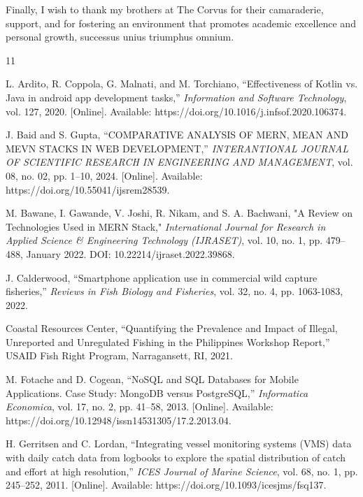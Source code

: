\documentclass[journal]{IEEEtran}
\begin{document}
Finally, I wish to thank my brothers at The Corvus for their camaraderie, support, and for fostering an environment that promotes academic excellence and personal growth, successus unius triumphus omnium.


\ifCLASSOPTIONcaptionsoff
  \newpage
\fi

\newpage

\begin{thebibliography}{11}

L. Ardito, R. Coppola, G. Malnati, and M. Torchiano, ``Effectiveness of Kotlin vs. Java in android app development tasks,'' \emph{Information and Software Technology}, vol. 127, 2020. [Online]. Available: https://doi.org/10.1016/j.infsof.2020.106374.

J. Baid and S. Gupta, ``COMPARATIVE ANALYSIS OF MERN, MEAN AND MEVN STACKS IN WEB DEVELOPMENT,'' \emph{INTERANTIONAL JOURNAL OF SCIENTIFIC RESEARCH IN ENGINEERING AND MANAGEMENT}, vol. 08, no. 02, pp. 1–10, 2024. [Online]. Available: https://doi.org/10.55041/ijsrem28539.

 M. Bawane, I. Gawande, V. Joshi, R. Nikam, and S. A. Bachwani, "A Review on Technologies Used in MERN Stack," \emph{International Journal for Research in Applied Science \& Engineering Technology (IJRASET)}, vol. 10, no. 1, pp. 479–488, January 2022. DOI: 10.22214/ijraset.2022.39868.

J. Calderwood, ``Smartphone application use in commercial wild capture fisheries,'' \emph{Reviews in Fish Biology and Fisheries}, vol. 32, no. 4, pp. 1063-1083, 2022.

Coastal Resources Center, ``Quantifying the Prevalence and Impact of Illegal, Unreported and Unregulated Fishing in the Philippines Workshop Report,'' USAID Fish Right Program, Narragansett, RI, 2021.

M. Fotache and D. Cogean, ``NoSQL and SQL Databases for Mobile Applications. Case Study: MongoDB versus PostgreSQL,'' \emph{Informatica Economica}, vol. 17, no. 2, pp. 41–58, 2013. [Online]. Available: https://doi.org/10.12948/issn14531305/17.2.2013.04.

H. Gerritsen and C. Lordan, ``Integrating vessel monitoring systems (VMS) data with daily catch data from logbooks to explore the spatial distribution of catch and effort at high resolution,'' \emph{ICES Journal of Marine Science}, vol. 68, no. 1, pp. 245–252, 2011. [Online]. Available: https://doi.org/10.1093/icesjms/fsq137.


\end{thebibliography}
\end{document}
